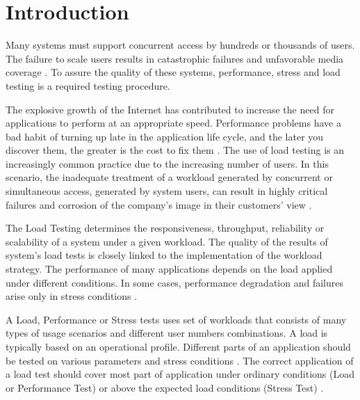 \section{Introduction}

Many systems must support concurrent
access by hundreds or thousands of users. The failure to scale users results in catastrophic failures and unfavorable media coverage \cite{Jiang2010}. To assure the quality of these systems, performance, stress and load testing is a required testing procedure\cite{Jiang2009}. 

The explosive growth of the Internet has contributed to  increase the need for applications to perform at an appropriate speed. Performance problems have a bad habit of turning up late in the application life cycle, and the later you discover them,  the greater is the cost to fix them \cite{Molyneaux2009}.
%
%
%
% 
%
The use of load testing is an increasingly common practice due to the increasing number of users. In this scenario, the inadequate treatment of a workload generated by concurrent or simultaneous
access, generated by system users, can result in highly critical failures and corrosion of the company's image in their customers' view \cite{Draheim2006b} \cite{Jiang2010}. 
%
%

The Load Testing determines the responsiveness, throughput, reliability or scalability of a system under a given workload. The quality of the results of system's load tests is closely linked to the implementation of the workload strategy. The performance of many applications depends on the load applied under different conditions. In some cases, performance degradation and failures arise only in stress conditions \cite{Garousi2010} \cite{Jiang2010}.

A  Load, Performance or Stress tests uses set of workloads that consists of many types of usage scenarios and different user numbers combinations. A load is typically based on an operational profile. Different parts of an application should be tested on various parameters and stress conditions \cite{Babbar2011}. The correct application of a load test should cover most part of application under ordinary conditions (Load or Performance Test) or above the expected load conditions (Stress Test) \cite{Draheim2006b} \cite{Luiz2011} \cite{Fe2004}.



